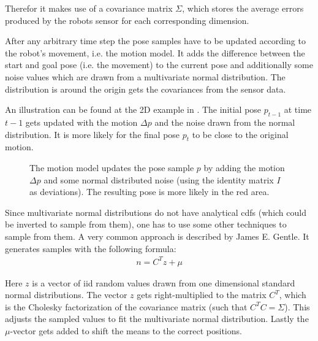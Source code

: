 \documentclass[Thesis.tex]{subfiles}
\begin{document}
Therefor it makes use of a covariance matrix $\Sigma$, which stores the average errors produced by the robots sensor for each corresponding dimension.


After any arbitrary time step the pose samples have to be updated according to the robot's movement, i.e. the motion model. It adds the difference between the start and goal pose (i.e. the movement) to the current pose and additionally some noise values which are drawn from a multivariate normal distribution. The distribution is around the origin gets the covariances from the sensor data. 

An illustration can be found at the 2D example in . The initial pose $p_{t-1}$ at time $t-1$ gets updated with the motion $\Delta p$ and the noise drawn from the normal distribution. It is more likely for the final pose $p_t$ to be close to the original motion.
\begin{figure}
  \caption{The motion model updates the pose sample $p$ by adding the motion $\Delta p$ and some normal distributed noise (using the identity matrix $I$ as deviations). The resulting pose is more likely in the red area.}
  \label{fig:2d_noise_sampling}
\end{figure}

Since multivariate normal distributions do not have analytical \gls{cdf}s (which could be inverted to sample from them), one has to use some other techniques to sample from them. A very common approach is described by James E. Gentle\cite[p.~197]{Gentle:2005}. It generates samples with the following formula:
%
\begin{align}
n = C^T z + \mu
\end{align}

Here $z$ is a vector of \gls{iid} random values drawn from one dimensional standard normal distributions. The vector $z$ gets right-multiplied to the matrix $C^T$, which is the Cholesky factorization of the covariance matrix (such that $C^TC = \Sigma$). This adjusts the sampled values to fit the multivariate normal distribution. Lastly the $\mu$-vector gets added to shift the means to the correct positions.
\end{document}
